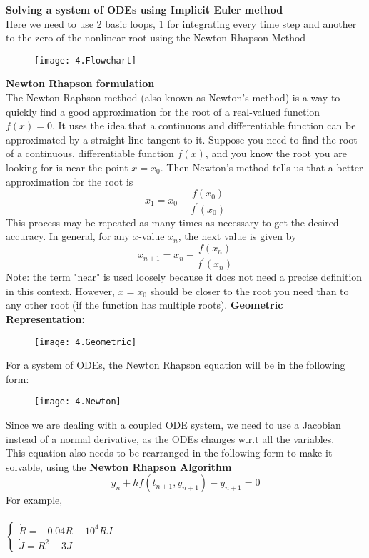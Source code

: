 \documentclass[a4paper]{article}
\begin{document}
\textbf{Solving a system of ODEs using Implicit Euler method}\\
Here we need to use 2 basic loops, 1 for integrating every time step and another to the zero of the nonlinear root using the Newton Rhapson Method\\
\begin{figure}[H]
\centering
\texttt{[image: 4.Flowchart]}
\end{figure}
\textbf{Newton Rhapson formulation}\\
The Newton-Raphson method (also known as Newton's method) is a way to quickly find a good approximation for the root of a real-valued function $f(x)=0$. It uses the idea that a continuous and differentiable function can be approximated by a straight line tangent to it.
Suppose you need to find the root of a continuous, differentiable function $f(x)$, and you know the root you are looking for is near the point $x=x_0$. Then Newton's method tells us that a better approximation for the root is
$$
x_1=x_0-\frac{f\left(x_0\right)}{f^{\prime}\left(x_0\right)}
$$
This process may be repeated as many times as necessary to get the desired accuracy. In general, for any $x$-value $x_n$, the next value is given by
$$
x_{n+1}=x_n-\frac{f\left(x_n\right)}{f^{\prime}\left(x_n\right)}
$$
Note: the term "near" is used loosely because it does not need a precise definition in this context. However, $x=x_0$ should be closer to the root you need than to any other root (if the function has multiple roots).
\textbf{Geometric Representation:}
\begin{figure}[H]
\centering
\texttt{[image: 4.Geometric]}
\end{figure}
For a system of ODEs, the Newton Rhapson equation will be in the following form:
\begin{figure}[H]
\centering
\texttt{[image: 4.Newton]}
\end{figure}
Since we are dealing with a coupled ODE system, we need to use a Jacobian instead of a normal derivative, as the ODEs changes w.r.t all the variables. \\
This equation also needs to be rearranged in the following form to make it solvable, using the \textbf{Newton Rhapson Algorithm}\\
\[{y_n} + hf({t_{n + 1}},{y_{n + 1}}) - {y_{n + 1}} = 0\]
For example, \\\\
$\left\{ \begin{array}{l}
\dot R =  - 0.04R + {10^4}RJ\\
\dot J = {R^2} - 3J
\end{array} \right.$ \\
\end{document}
